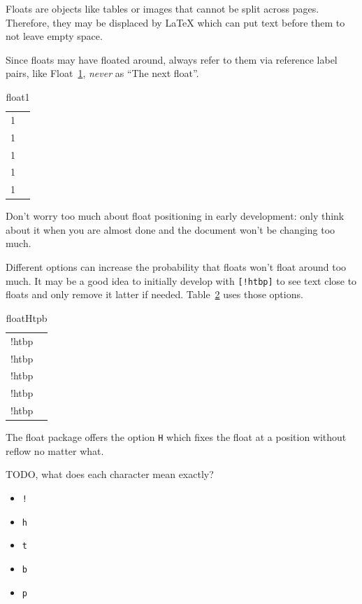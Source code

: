 \documentclass[12pt]{article}
\begin{document}
  Floats are objects like tables or images that cannot be split across pages.
  Therefore, they may be displaced by LaTeX which can put text before them to
  not leave empty space.

  Since floats may have floated around, always refer to them via reference label pairs,
  like Float~\ref{float1}, \emph{never} as ``The next float''.

  \begin{table}
    \begin{tabular}{cc}
      1 \\ 1 \\ 1 \\ 1 \\ 1 \\
    \end{tabular}
    \caption{float1}
    \label{float1}
  \end{table}

  Don't worry too much about float positioning in early development: only think about
  it when you are almost done and the document won't be changing too much.

  Different options can increase the probability that floats won't float around too much.
  It may be a good idea to initially develop with \lstinline|[!htbp]| to see text close to floats
  and only remove it latter if needed. Table~\ref{floatHtpb} uses those options.

  \begin{table}
    \begin{tabular}{cc}
      !htbp \\ !htbp \\ !htbp \\ !htbp \\ !htbp \\
    \end{tabular}
    \caption{floatHtpb}
    \label{floatHtpb}
  \end{table}

  The float package offers the option \lstinline|H| which fixes the float at a position without reflow no matter what.

  TODO, what does each character mean exactly?

  \begin{itemize}
    \item \lstinline|!|
    \item \lstinline|h|
    \item \lstinline|t|
    \item \lstinline|b|
    \item \lstinline|p|
  \end{itemize}
\end{document}
